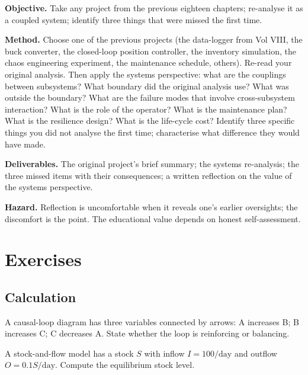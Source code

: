 \begin{project}
\textbf{Objective.} Take any project from the previous eighteen chapters; re-analyse it as a coupled system; identify three things that were missed the first time.

\textbf{Method.} Choose one of the previous projects (the data-logger from Vol VIII, the buck converter, the closed-loop position controller, the inventory simulation, the chaos engineering experiment, the maintenance schedule, others). Re-read your original analysis. Then apply the systems perspective: what are the couplings between subsystems? What boundary did the original analysis use? What was outside the boundary? What are the failure modes that involve cross-subsystem interaction? What is the role of the operator? What is the maintenance plan? What is the resilience design? What is the life-cycle cost? Identify three specific things you did not analyse the first time; characterise what difference they would have made.

\textbf{Deliverables.} The original project's brief summary; the systems re-analysis; the three missed items with their consequences; a written reflection on the value of the systems perspective.

\textbf{Hazard.} Reflection is uncomfortable when it reveals one's earlier oversights; the discomfort is the point. The educational value depends on honest self-assessment.
\end{project}

\section{Exercises}

\subsection*{Calculation}

\begin{exercise}
A causal-loop diagram has three variables connected by arrows: A increases B; B increases C; C decreases A. State whether the loop is reinforcing or balancing.
\end{exercise}

\begin{exercise}
A stock-and-flow model has a stock $S$ with inflow $I = 100/\text{day}$ and outflow $O = 0.1 S/\text{day}$. Compute the equilibrium stock level.
\end{exercise}

